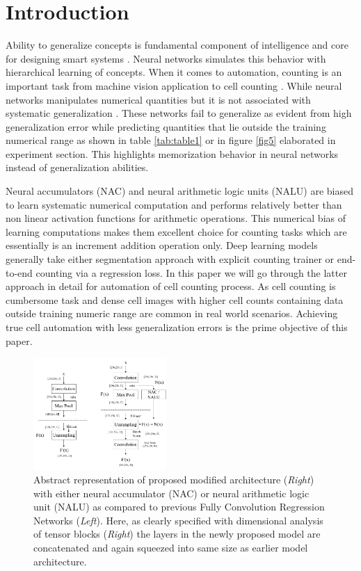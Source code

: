 \documentclass[conference]{IEEEtran}
\begin{document}
\section{Introduction}

Ability to generalize concepts is fundamental component of intelligence and core for designing
smart systems \cite{b6, b7}. Neural networks simulates this behavior with hierarchical learning of concepts. When it comes to automation, counting is an important task from machine vision application \cite{b1} to cell counting \cite{b2}. While neural networks manipulates numerical quantities but it is not associated with systematic generalization \cite{b3, b4}. These networks fail to generalize as evident from high generalization error while predicting quantities that lie outside the training numerical range as shown in table \ref{tab:table1} or in figure \ref{fig5} elaborated in experiment section. This highlights memorization behavior in neural networks instead of generalization abilities.

Neural accumulators (NAC) and neural arithmetic logic units (NALU) \cite{b5} are biased to learn
systematic numerical computation and performs relatively better than non linear activation functions for arithmetic operations. This numerical bias of learning computations makes
them excellent choice for counting tasks which are essentially is an increment addition operation
only. Deep learning models generally take either segmentation approach with explicit counting trainer or end-to-end counting via a regression loss. In this paper we will go through the
latter approach \cite{b2} in detail for automation of cell counting process. As cell counting is cumbersome task and dense cell images with higher cell counts containing data outside training numeric range are common in real world scenarios. Achieving true cell automation with less generalization errors is the prime objective of this paper.

\begin{figure}[!h]
\centering
\includegraphics[width=0.45\textwidth]{assets/model-abstract-diagram.png}
\caption{Abstract representation of proposed modified architecture (\textit{Right}) with either neural accumulator (NAC) or neural arithmetic logic unit (NALU) as compared to previous Fully Convolution Regression Networks (\textit{Left}). Here, as clearly specified with dimensional analysis of tensor blocks (\textit{Right})  the layers in the newly proposed model are concatenated and again squeezed into same size as earlier  model architecture.}
\label{fig1}
\end{figure}
\end{document}
